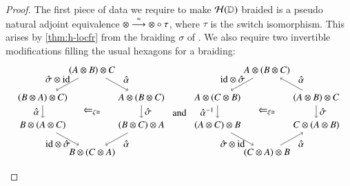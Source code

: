 \documentclass{amsart}
\begin{document}
\begin{proof}
  The first piece of data we require to make $\cH(\lD)$ braided is a
  pseudo natural adjoint equivalence $\mathord{\otimes} \too[\eqv]
  \mathord{\otimes}\circ \tau$, where $\tau$ is the switch
  isomorphism.  This arises by \autoref{thm:h-locfr} from the braiding $\sigma$
  of \lD.  We also require two invertible modifications filling the
  usual hexagons for a braiding:
  \begin{equation}
  \begin{aligned}
\begin{tikzpicture}[xscale=0.9]
\node (t) at (2,3) {$(A \otimes B) \otimes C$};
\node (tl) at (0,2) {$(B \otimes A) \otimes C)$};
\node (bl) at (0,1) {$B \otimes  (A \otimes C)$};
\node (b) at (2,0) {$B \otimes (C \otimes A)$};
\node (tr) at (4,2) {$A \otimes (B \otimes C)$};
\node (br) at (4,1) {$(B \otimes C) \otimes A$};
\draw[->] (t) to node [above,xshift=10pt, yshift=-2] {$\hat{\alpha}$} (tr);
\draw[->] (tr) to node [right] {$\hat{\sigma}$} (br);
\draw[->] (br) to node [below,xshift=10pt, yshift=2pt] {$\hat{\alpha}$} (b);
\draw[->] (t) to node [above,xshift=-10pt, yshift=-2pt] {$\hat{\sigma} \otimes \mbox{id}$} (tl);
\draw[->] (tl) to node [left] {$\hat{\alpha}$} (bl);
\draw[->] (bl) to node [below,xshift=-10pt,yshift=2pt] {$\mathid \otimes \hat{\sigma}$} (b);
\node at (2,1.5) {$\Leftarrow_{\zeta \iso}$};
\end{tikzpicture}
  \end{aligned}
\hspace{5pt}\mbox{and} \hspace{5pt}
\begin{aligned}
\begin{tikzpicture}[xscale=0.9]
\node (t) at (2,3) {$A \otimes (B \otimes C)$};
\node (tl) at (0,2) {$A \otimes (C \otimes B)$};
\node (bl) at (0,1) {$(A \otimes  C) \otimes B$};
\node (b) at (2,0) {$(C \otimes A) \otimes B$};
\node (tr) at (4,2) {$(A \otimes B) \otimes C$};
\node (br) at (4,1) {$C \otimes (A \otimes B)$};
\draw[->] (tr) to node [above,xshift=10pt, yshift=-2] {$\hat{\alpha}$} (t);
\draw[->] (tr) to node [right] {$\hat{\sigma} $} (br);
\draw[->] (b) to node [below,xshift=10pt, yshift=2pt] {$\hat{\alpha}$} (br);
\draw[->] (t) to node [above,xshift=-10pt, yshift=-2pt] {$\mbox{id} \otimes \hat{\sigma}$} (tl);
\draw[->] (tl) to node [left] {$\hat{\alpha}^{-1}$} (bl);
\draw[->] (bl) to node [below,xshift=-10pt,yshift=2pt] {$\hat{\sigma} \otimes \mathid$} (b);
\node at (2,1.5) {$\Leftarrow_{\xi \iso}$};
\end{tikzpicture}
\end{aligned}
\end{equation}


\end{proof}
\end{document}
